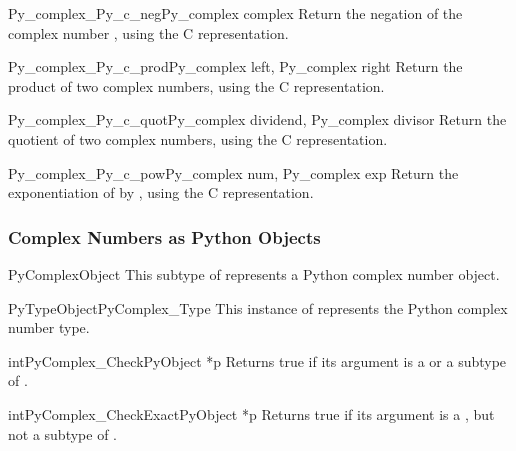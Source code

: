 \begin{cfuncdesc}{Py_complex}{_Py_c_neg}{Py_complex complex}
  Return the negation of the complex number , using the C
   representation.
\end{cfuncdesc}

\begin{cfuncdesc}{Py_complex}{_Py_c_prod}{Py_complex left, Py_complex right}
  Return the product of two complex numbers, using the C
   representation.
\end{cfuncdesc}

\begin{cfuncdesc}{Py_complex}{_Py_c_quot}{Py_complex dividend,
                                          Py_complex divisor}
  Return the quotient of two complex numbers, using the C
   representation.
\end{cfuncdesc}

\begin{cfuncdesc}{Py_complex}{_Py_c_pow}{Py_complex num, Py_complex exp}
  Return the exponentiation of  by , using the C
   representation.
\end{cfuncdesc}


\subsubsection{Complex Numbers as Python Objects}

\begin{ctypedesc}{PyComplexObject}
  This subtype of  represents a Python complex number
  object.
\end{ctypedesc}

\begin{cvardesc}{PyTypeObject}{PyComplex_Type}
  This instance of  represents the Python complex
  number type.
\end{cvardesc}

\begin{cfuncdesc}{int}{PyComplex_Check}{PyObject *p}
  Returns true if its argument is a  or a
  subtype of .
\end{cfuncdesc}

\begin{cfuncdesc}{int}{PyComplex_CheckExact}{PyObject *p}
  Returns true if its argument is a , but not a
  subtype of .
\end{cfuncdesc}

